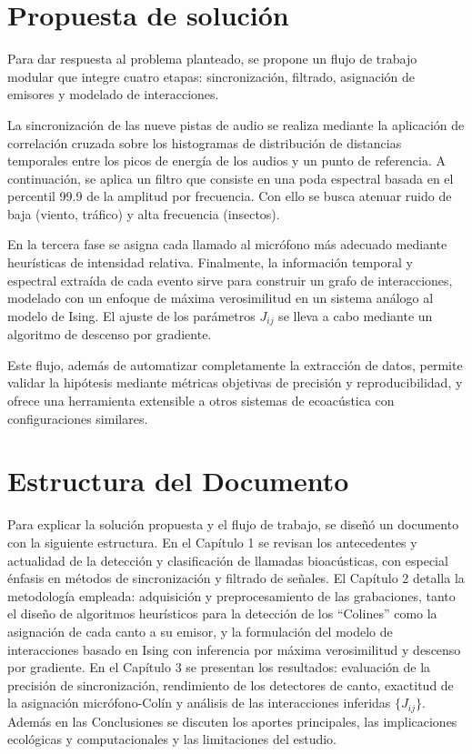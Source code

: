 \section{Propuesta de solución}
\label{sec:propuesta_solucion}

Para dar respuesta al problema planteado, se propone un 
flujo de trabajo modular que integre cuatro etapas: 
sincronización, filtrado, asignación de 
emisores y modelado de interacciones. 

La sincronización de las nueve pistas de audio se realiza 
mediante la aplicación de correlación cruzada sobre los histogramas
de distribución de distancias temporales entre los picos de energía de los audios 
y un punto de referencia. A continuación, se 
aplica un filtro que consiste en una poda espectral
basada en el percentil 99.9 de la amplitud por frecuencia.
Con ello se busca atenuar 
ruido de baja (viento, tráfico) y alta frecuencia (insectos).  

En la tercera fase se asigna cada 
llamado al micrófono más adecuado mediante heurísticas de 
intensidad relativa. 
Finalmente, la información temporal y espectral extraída de cada 
evento sirve para construir un grafo de interacciones, 
modelado con un enfoque de máxima verosimilitud en un sistema 
análogo al modelo de Ising. El ajuste de los 
parámetros \(J_{ij}\) se lleva a cabo mediante un algoritmo de 
descenso por gradiente.  

Este flujo, además de automatizar completamente la extracción de 
datos, permite validar la hipótesis mediante 
métricas objetivas de precisión y reproducibilidad, y ofrece 
una herramienta extensible a otros sistemas de ecoacústica con 
configuraciones similares.  


\section{Estructura del Documento}
\label{sec:estructura_documento}

Para explicar la solución propuesta y el flujo de trabajo, 
se diseñó un documento con la siguiente estructura. 
En el Capítulo 1 se revisan los antecedentes y actualidad de la 
detección y 
clasificación de llamadas bioacústicas, con especial énfasis 
en métodos de sincronización y filtrado de señales. 
El Capítulo 2 detalla la metodología empleada: adquisición y 
preprocesamiento de las grabaciones, tanto el diseño de 
algoritmos heurísticos 
para la detección de los “Colines” como la asignación de cada 
canto a su emisor, y la formulación del modelo de interacciones 
basado en Ising con inferencia por máxima verosimilitud y 
descenso por gradiente. En el Capítulo 3 se presentan los 
resultados: evaluación de la precisión de 
sincronización, rendimiento de los detectores de canto, 
exactitud de la asignación micrófono-Colín y análisis de las 
interacciones inferidas \(\{J_{ij}\}\). Además en las 
Conclusiones se discuten los aportes principales, las 
implicaciones ecológicas y computacionales y las limitaciones 
del estudio.


